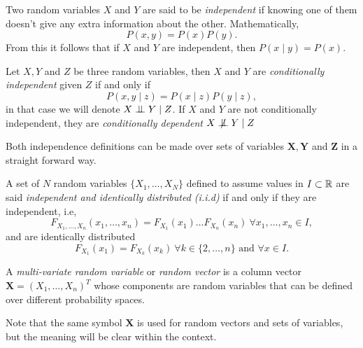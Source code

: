 \begin{definition}
Two random variables \(X\) and \(Y\) are said to be \emph{independent} if knowing one of them doesn't give any extra information about the other. Mathematically,
\[
P(x,y) = P(x)P(y).
\]
From this it follows that if \(X\) and \(Y\) are independent, then \(P(x\mid y) = P(x)\).
\end{definition}


\begin{definition}
Let \(X,Y\) and \(Z\) be three random variables, then \(X\) and \(Y\) are
\emph{conditionally independent} given \(Z\) if and only if
\[
P(x,y \mid  z) = P(x\mid z)P(y\mid z),
\]
in that case we will denote \(X \bigCI Y \mid Z\). If \(X\) and \(Y\) are not
conditionally independent, they are \emph{conditionally dependent} \(X \bigCD Y \mid Z\)

\end{definition}

Both independence definitions can be made over sets of variables \(\bm{X},
\bm{Y}\) and \(\bm{Z}\) in a straight forward way.


\begin{definition}
  A set of \(N\) random variables \(\{X_1,\dots,X_N\}\) defined to
  assume values in \(I \subset \mathbb{R}\) are said
  \emph{independent and identically distributed (i.i.d)}
  if and only if they are independent, i.e,
  \[
    F_{X_1,\dots,X_n}(x_1,\dots,x_n) = F_{X_1}(x_1)\dots F_{X_n}(x_n) \ \forall
    x_1,\dots,x_n \in I,
  \]
  and are identically distributed
  \[
    F_{X_1}(x_1) = F_{X_k}(x_k) \ \forall k \in \{2,\dots,n\} \text{ and } \forall x
    \in I.
  \]


\end{definition}


\begin{definition}
  A \emph{multi-variate random variable} or \emph{random vector} is a column vector \(\bm{X} =
  (X_1,\dots,X_n)^T\) whose components are random variables that can be defined
  over different probability spaces.

  Note that the same symbol \(\bm{X}\) is used for random vectors and sets of
  variables, but the meaning will be clear within the context.
\end{definition}
